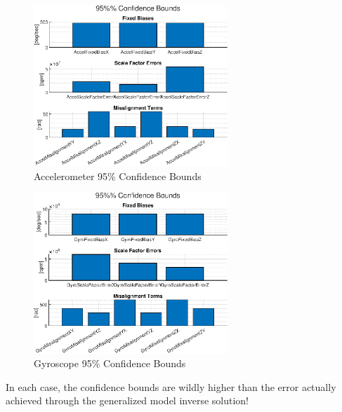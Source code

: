 \begin{figure}[h] 
	\centering
	\includegraphics[width=0.65\textwidth]{./images/MAM_accel_model_95_confidence_bounds.eps}
	\caption{Accelerometer 95\% Confidence Bounds}
	\label{fig: multi-axis accel 95 confidence bounds}
\end{figure}
\FloatBarrier

\begin{figure}[h] 
	\centering
	\includegraphics[width=0.65\textwidth]{./images/MAM_gyro_model_95_confidence_bounds.eps}
	\caption{Gyroscope 95\% Confidence Bounds}
	\label{fig: multi-axis gyro 95 confidence bounds}
\end{figure}
\FloatBarrier

In each case, the confidence bounds are wildly higher than the error actually achieved through the generalized model inverse solution!


